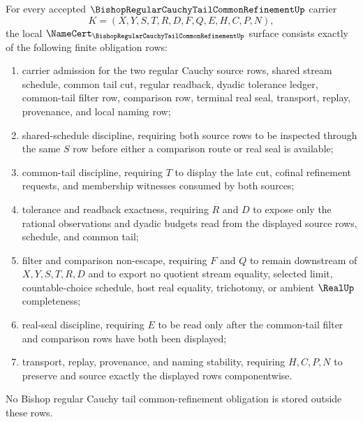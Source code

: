\begin{theorem}
\label{thm:bishop-regular-cauchy-tail-common-refinement-namecert-obligations}
For every accepted $\BishopRegularCauchyTailCommonRefinementUp$ carrier
$$
K=(X,Y,S,T,R,D,F,Q,E,H,C,P,N),
$$
the local $\NameCert_{\BishopRegularCauchyTailCommonRefinementUp}$ surface consists exactly of the following finite obligation rows:
\begin{enumerate}
\item carrier admission for the two regular Cauchy source rows, shared stream schedule, common tail cut, regular readback, dyadic tolerance ledger, common-tail filter row, comparison row, terminal real seal, transport, replay, provenance, and local naming row;
\item shared-schedule discipline, requiring both source rows to be inspected through the same $S$ row before either a comparison route or real seal is available;
\item common-tail discipline, requiring $T$ to display the late cut, cofinal refinement requests, and membership witnesses consumed by both sources;
\item tolerance and readback exactness, requiring $R$ and $D$ to expose only the rational observations and dyadic budgets read from the displayed source rows, schedule, and common tail;
\item filter and comparison non-escape, requiring $F$ and $Q$ to remain downstream of $X,Y,S,T,R,D$ and to export no quotient stream equality, selected limit, countable-choice schedule, host real equality, trichotomy, or ambient $\RealUp$ completeness;
\item real-seal discipline, requiring $E$ to be read only after the common-tail filter and comparison rows have both been displayed;
\item transport, replay, provenance, and naming stability, requiring $H,C,P,N$ to preserve and source exactly the displayed rows componentwise.
\end{enumerate}
No Bishop regular Cauchy tail common-refinement obligation is stored outside these rows.
\end{theorem}

